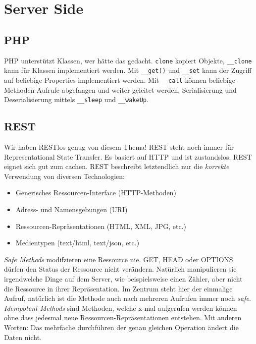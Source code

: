 \chapter{Server Side}

\section{PHP}

PHP unterstützt Klassen, wer hätte das gedacht. \lstinline|clone| kopiert Objekte, \lstinline|__clone| kann für Klassen implementiert werden. Mit \lstinline|__get()| und \lstinline|__set| kann der Zugriff auf beliebige Properties implementiert werden. Mit \lstinline|__call| können beliebige Methoden-Aufrufe
abgefangen und weiter geleitet werden. Serialisierung und Deserialisierung mittels \lstinline|__sleep| und \lstinline|__wakeUp|.

\section{REST}
Wir haben RESTlos genug von diesem Thema! REST steht noch immer für Representational State Transfer. Es basiert auf HTTP und ist zustandslos. REST eignet sich gut zum cachen. REST beschreibt letztendlich nur die \emph{korrekte} Verwendung von diversen Technologien:

\begin{itemize}
	\item Generisches Ressourcen-Interface (HTTP-Methoden)
	\item Adress- und Namensgebungen (URI)
	\item Ressourcen-Repräsentationen (HTML, XML, JPG, etc.)
	\item Medientypen (text/html, text/json, etc.)	
\end{itemize}

\emph{Safe Methods} modifzieren eine Ressource nie. GET, HEAD oder OPTIONS dürfen den Status der Ressource nicht verändern. Natürlich manipulieren sie irgendwelche Dinge auf dem Server, wie beispielsweise einen Zähler, aber nicht die Ressource in ihrer Repräsentation. Im Zentrum steht hier der einmalige Aufruf, natürlich ist die Methode auch nach mehreren Aufrufen immer noch \emph{safe}. \emph{Idempotent Methods} sind Methoden, welche x-mal aufgerufen werden können ohne dass jedesmal neue Ressourcen-Repräsentationen entstehen. Mit anderen Worten: Das mehrfache durchführen der genau gleichen Operation ändert die Daten nicht.

